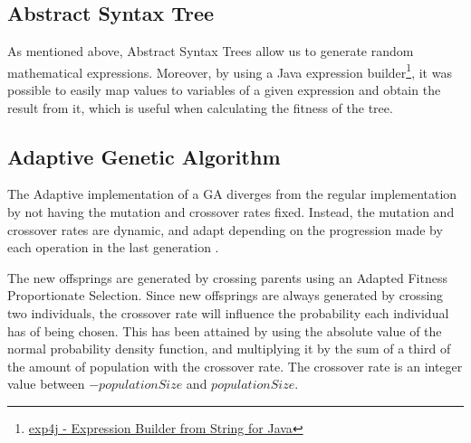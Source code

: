 \documentclass[runningheads]{llncs}
\begin{document}
\subsection{Abstract Syntax Tree}

As mentioned above, Abstract Syntax Trees allow us to generate random mathematical expressions. Moreover, by using a Java expression builder\footnote{\href{https://www.objecthunter.net/exp4j/index.htm}{exp4j - Expression Builder from String for Java}}, it was possible to easily map values to variables of a given expression and obtain the result from it, which is useful when calculating the fitness of the tree.
%
%
%
%

\subsection{Adaptive Genetic Algorithm}
The Adaptive implementation of a GA diverges from the regular implementation by not having the mutation and crossover rates fixed. Instead, the mutation and crossover rates are dynamic, and adapt depending on the progression made by each operation in the last generation \cite{adaptativeCrossOverMutation}.

The new offsprings are generated by crossing parents using an Adapted Fitness Proportionate Selection. Since new offsprings are always generated by crossing two individuals, the crossover rate will influence the probability each individual has of being chosen. This has been attained by using the absolute value of the normal probability density function, and multiplying it by the sum of a third of the amount of population with the crossover rate. The crossover rate is an integer value between \(-populationSize\) and \(populationSize\).
\end{document}
